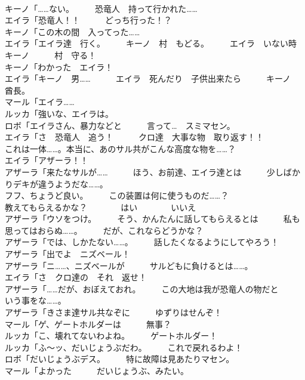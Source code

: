 \documentclass[8pt]{extreport}
\begin{document}
\begin{CJK}{UTF8}{min}
\\	キーノ「……ない。　　　恐竜人　持って行かれた……	
\\	エイラ「恐竜人！！　　　どっち行った！？	
\\	キーノ「この木の間　入ってった……	
\\	エイラ「エイラ達　行く。　　　キーノ　村　もどる。　　　エイラ　いない時　キーノ　　　村　守る！	
\\	キーノ「わかった　エイラ！	
\\	エイラ「キーノ　男……　　　エイラ　死んだり　子供出来たら　　　キーノ　酋長。	
\\	マール「エイラ……	
\\	ルッカ「強いな、エイラは。	
\\	ロボ「エイラさん、暴力などと　　　言って…　スミマセン。	
\\	エイラ「さ　恐竜人　追う！　　　クロ達　大事な物　取り返す！！	
\\	これは一体……。本当に、あのサル共がこんな高度な物を……？	
\\	エイラ「アザーラ！！	
\\	アザーラ「来たなサルが……　　　ほう、お前達、エイラ達とは　　　少しばかりデキが違うようだな……。	
\\	フフ、ちょうど良い。　　　この装置は何に使うものだ……？	
\\	教えてもらえるかな？　　　　はい　　　　いいえ	
\\	アザーラ「ウソをつけ。　　　そう、かんたんに話してもらえるとは　　　私も思ってはおらぬ……。　　　だが、これならどうかな？	
\\	アザーラ「では、しかたない……。　　　話したくなるようにしてやろう！	
\\	アザーラ「出でよ　ニズベール！	
\\	アザーラ「ニ……、ニズベールが　　　サルどもに負けるとは……。	
\\	エイラ「さ　クロ達の　それ　返せ！	
\\	アザーラ「……だが、おぼえておれ。　　　この大地は我が恐竜人の物だと　　　いう事をな……。	
\\	アザーラ「きさま達サル共なぞに　　　ゆずりはせんぞ！	
\\	マール「ゲ、ゲートホルダーは　　　無事？	
\\	ルッカ「こ、壊れてないわよね。　　　ゲートホルダー！	
\\	ルッカ「ふ～ッ、だいじょうぶだわ。　　　これで戻れるわよ！	
\\	ロボ「だいじょうぶデス。　　　特に故障は見あたりマセン。	
\\	マール「よかった　　　だいじょうぶ、みたい。	

\end{CJK}
\end{document}
